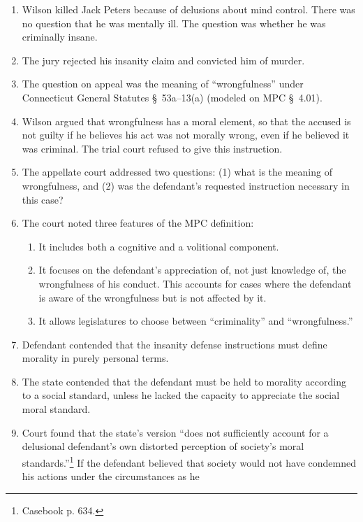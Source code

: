 \begin{enumerate}
    \item Wilson killed Jack Peters because of delusions about mind control. 
    There was no question that he was mentally ill. The question was whether 
    he was criminally insane.
    \item The jury rejected his insanity claim and convicted him of murder.  
    \item The question on appeal was the meaning of ``wrongfulness'' under 
    Connecticut General Statutes \S\ 53a--13(a) (modeled on MPC \S\ 4.01).
    \item Wilson argued that wrongfulness has a moral element, so that the 
    accused is not guilty if he believes his act was not morally wrong, even 
    if he believed it was criminal. The trial court refused to give this 
    instruction.
    \item The appellate court addressed two questions: (1) what is the meaning 
    of wrongfulness, and (2) was the defendant's requested instruction 
    necessary in this case?
    \item The court noted three features of the MPC definition:
    \begin{enumerate}
        \item It includes both a cognitive and a volitional component.
        \item It focuses on the defendant's appreciation of, not just 
        knowledge of, the wrongfulness of his conduct. This accounts for cases 
        where the defendant is aware of the wrongfulness but is not affected 
        by it.
        \item It allows legislatures to choose between ``criminality'' and 
        ``wrongfulness.''
    \end{enumerate}
    \item Defendant contended that the insanity defense instructions must 
    define morality in purely personal terms.
    \item The state contended that the defendant must be held to morality 
    according to a social standard, unless he lacked the capacity to 
    appreciate the social moral standard.
    \item Court found that the state's version ``does not sufficiently account 
    for a delusional defendant's own distorted perception of society's moral 
    standards.''\footnote{Casebook p. 634.} If the defendant believed that 
    society would not have condemned his actions under the circumstances as he 

\end{enumerate}
